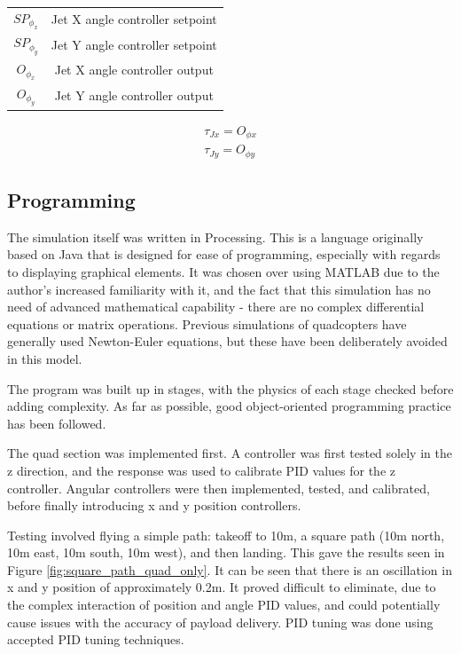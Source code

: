 \documentclass[11pt]{article}
\begin{document}
\begin{center}
\begin{tabular}{cc}
    $SP_{\phi_x}$ & Jet X angle controller setpoint \\
    $SP_{\phi_y}$ & Jet Y angle controller setpoint \\
    $O_{\phi_x}$ & Jet X angle controller output \\
    $O_{\phi_y}$ & Jet Y angle controller output \\
\end{tabular}

\begin{eqnarray}
    \tau_{Jx} = O_{\phi x} \\
    \tau_{Jy} = O_{\phi y}
\end{eqnarray}
\end{center}

\subsection{Programming}
The simulation itself was written in Processing. This is a language originally based on Java that is designed for ease of programming, especially with regards to displaying graphical elements\cite{processing}. It was chosen over using MATLAB due to the author's increased familiarity with it, and the fact that this simulation has no need of advanced mathematical capability - there are no complex differential equations or matrix operations. Previous simulations of quadcopters have generally used Newton-Euler equations\cite{quad_modelling_matlab}\cite{quad_modelling}\cite{quadcopter_dynamics}, but these have been deliberately avoided in this model.

The program was built up in stages, with the physics of each stage checked before adding complexity. As far as possible, good object-oriented programming practice has been followed.

The quad section was implemented first. A controller was first tested solely in the z direction, and the response was used to calibrate PID values for the z controller. Angular controllers were then implemented, tested, and calibrated, before finally introducing x and y position controllers.

Testing involved flying a simple path: takeoff to 10m, a square path (10m north, 10m east, 10m south, 10m west), and then landing. This gave the results seen in Figure \ref{fig:square_path_quad_only}. It can be seen that there is an oscillation in x and y position of approximately 0.2m. It proved difficult to eliminate, due to the complex interaction of position and angle PID values, and could potentially cause issues with the accuracy of payload delivery. PID tuning was done using accepted PID tuning techniques\cite{PID_tuning}.
\end{document}
